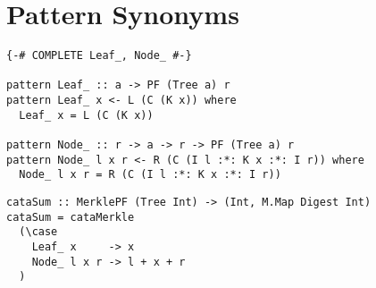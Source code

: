 \section{Pattern Synonyms}
\begin{verbatim}
{-# COMPLETE Leaf_, Node_ #-}

pattern Leaf_ :: a -> PF (Tree a) r
pattern Leaf_ x <- L (C (K x)) where
  Leaf_ x = L (C (K x))

pattern Node_ :: r -> a -> r -> PF (Tree a) r
pattern Node_ l x r <- R (C (I l :*: K x :*: I r)) where
  Node_ l x r = R (C (I l :*: K x :*: I r))
\end{verbatim}

\begin{verbatim}
cataSum :: MerklePF (Tree Int) -> (Int, M.Map Digest Int)
cataSum = cataMerkle
  (\case
    Leaf_ x     -> x
    Node_ l x r -> l + x + r
  )
\end{verbatim}